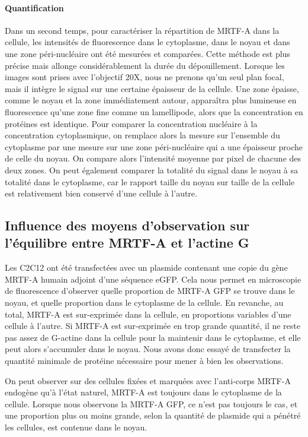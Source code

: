  
 \paragraph{Quantification}
 Dans un second temps, pour caractériser la répartition de MRTF-A dans la cellule, les intensités de fluorescence dans le cytoplasme, dans le noyau et dans une zone péri-nucléaire ont été mesurées et comparées. Cette méthode est plus précise mais allonge considérablement la durée du dépouillement. 
 Lorsque les images sont prises avec l'objectif 20X, nous ne prenons qu'un seul plan focal, mais il intègre le signal sur une certaine épaisseur de la cellule. Une zone épaisse, comme le noyau et la zone immédiatement autour, apparaîtra plus lumineuse en fluorescence qu'une zone fine comme un lamellipode, alors que la concentration en protéines est identique. 
 Pour comparer la concentration nucléaire à la concentration cytoplasmique, on remplace alors la mesure sur l'ensemble du cytoplasme par une mesure sur une zone péri-nucléaire qui a une épaisseur proche de celle du noyau. On compare alors l'intensité moyenne par pixel de chacune des deux zones.
 On peut également comparer la totalité du signal dans le noyau à sa totalité dans le cytoplasme, car le rapport taille du noyau sur taille de la cellule est relativement bien conservé d'une cellule à l'autre. 
 


\subsection{Influence des moyens d'observation sur l'équilibre entre MRTF-A et l'actine G}

Les C2C12 ont été transfectées avec un plasmide contenant une copie du gène MRTF-A humain adjoint d'une séquence eGFP. 
Cela nous permet en microscopie de fluorescence d'observer quelle proportion de MRTF-A GFP se trouve dans le noyau, et quelle proportion dans le cytoplasme de la cellule. 
En revanche, au total, MRTF-A est sur-exprimée dans la cellule, en proportions variables d'une cellule à l'autre. 
Si MRTF-A est sur-exprimée en trop grande quantité, il ne reste pas assez de G-actine dans la cellule pour la maintenir dans le cytoplasme, et elle peut alors s'accumuler dans le noyau. 
Nous avons donc essayé de transfecter la quantité minimale de protéine nécessaire pour mener à bien les observations. 

On peut observer sur des cellules fixées et marquées avec l'anti-corps MRTF-A endogène qu'à l'état naturel, MRTF-A est toujours dans le cytoplasme de la cellule. 
Lorsque nous observons la MRTF-A GFP, ce n'est pas toujours le cas, et une proportion plus ou moins grande, selon la quantité de plasmide qui a pénétré les cellules, est contenue dans le noyau.


